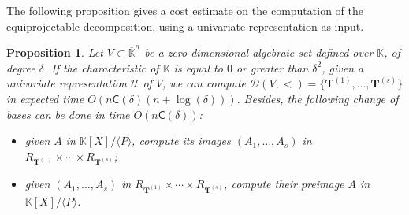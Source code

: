 \documentclass[12pt]{article}
\def\CC {\ensuremath{\mathsf{C}}}
\def\K {\ensuremath{\mathbb{K}}}
\def\Kbar {\ensuremath{\overline{\mathbb{K}}}}
\def\Tt {\ensuremath{\mathbf{T}}}
\def\Ur {\ensuremath{\mathscr U}}
\def\Dr {\ensuremath{\mathscr D}}
\newtheorem{Prop}{Proposition}
\begin{document}
The following proposition gives a cost estimate on the computation of
the equiprojectable decomposition, using a univariate representation
as input.
\begin{Prop}\label{lemma:equi}
  Let $V\subset \Kbar^n$ be a zero-dimensional algebraic set defined
  over $\K$, of degree $\delta$. If the characteristic of $\K$ is
  equal to $0$ or greater than $\delta^2$, given a univariate
  representation $\Ur$ of $V$, we can compute
  $\Dr(V,<)=\{\Tt^{(1)},\dots,\Tt^{(s)}\}$ in expected time
  $O(n\CC(\delta) (n+\log(\delta))).$ Besides, the following change of
  bases can be done in time $O(n\CC(\delta))$:
  \begin{itemize}
  \item given $A$ in $\K[X]/\langle P \rangle$, compute its images
    $(A_1,\dots,A_s)$ in $R_{\Tt^{(1)}} \times \cdots \times
    R_{\Tt^{(s)}}$;
  \item given $(A_1,\dots,A_s)$ in $R_{\Tt^{(1)}}\times\cdots\times
    R_{\Tt^{(s)}}$, compute their preimage $A$ in $\K[X]/\langle P
    \rangle$.
  \end{itemize}
\end{Prop}
\end{document}
